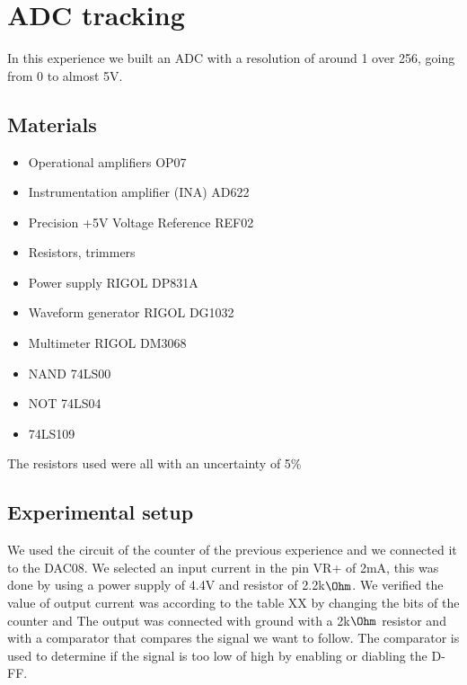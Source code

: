 \chapter{ADC tracking}
In this experience we built an ADC with a resolution of around 1 over 256, going from 0 to almost 5V.

\section{Materials}
\begin{itemize}
\item Operational amplifiers OP07
\item Instrumentation amplifier (INA) AD622
\item Precision +5V Voltage Reference REF02
\item Resistors, trimmers
\item Power supply RIGOL DP831A
\item Waveform generator RIGOL DG1032
\item Multimeter RIGOL DM3068
\item NAND 74LS00
\item NOT 74LS04
\item 74LS109 
\end{itemize}
The resistors used were all with an uncertainty of 5\%

\section{Experimental setup}
We used the circuit of the counter of the previous experience and we connected it to the DAC08. We selected an input current in the pin VR+ of 2mA, this was done by using a power supply of 4.4V and resistor of 2.2k$\Ohm$. We verified the value of output current was according to the table XX by changing the bits of the counter and The output was connected with ground with a 2k$\Ohm$ resistor and with a comparator that compares the signal we want to follow. The comparator is used to determine if the signal is too low of high by enabling or diabling the D-FF.